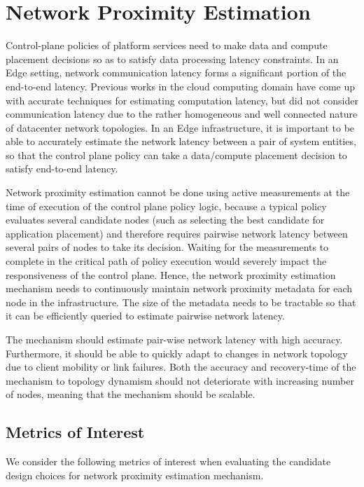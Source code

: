 \section{Network Proximity Estimation}
\label{sec:nw_prox_dse}
Control-plane policies of platform services need to make data and compute placement decisions so as to satisfy data processing latency constraints. In an Edge setting, network communication latency forms a significant portion of the end-to-end latency. Previous works in the cloud computing domain have come up with accurate techniques for estimating computation latency, but did not consider communication latency due to the rather homogeneous and well connected nature of datacenter network topologies. In an Edge infrastructure, it is important to be able to accurately estimate the network latency between a pair of system entities, so that the control plane policy can take a data/compute placement decision to satisfy end-to-end latency.
\par Network proximity estimation cannot be done using active measurements at the time of execution of the control plane policy logic, because a typical policy evaluates several candidate nodes (such as selecting the best candidate for application placement) and therefore  requires pairwise network latency between several pairs of nodes to take its decision. Waiting for the measurements to complete in the critical path of policy execution would severely impact the responsiveness of the control plane. Hence, the network proximity estimation mechanism needs to continuously maintain network proximity metadata for each node in the infrastructure. The size of the metadata needs to be tractable so that it can be efficiently queried to estimate pairwise network latency.
\par The mechanism should estimate pair-wise network latency with high accuracy. Furthermore, it should be able to quickly adapt to changes in network topology due to client mobility or link failures. Both the accuracy and recovery-time of the mechanism to topology dynamism should not deteriorate with increasing number of nodes, meaning that the mechanism should be scalable.

\subsection{Metrics of Interest}
We consider the following metrics of interest when evaluating the candidate design choices for network proximity estimation mechanism.

